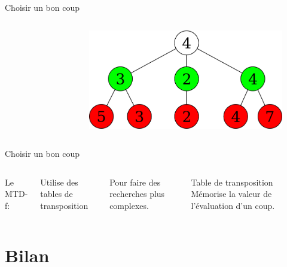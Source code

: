 \documentclass{beamer}
\begin{document}
\begin{frame}{Choisir un bon coup}
\begin{columns}
{{{\begin{figure}[h]
							\end{figure}
						} {
							\begin{figure}[h]
								\centering
								\includegraphics[width=\textwidth]{images/minimax_ex_3.png}
							\end{figure}
						}
					}
				}

		\end{columns}
	\end{frame}

	\begin{frame}{Choisir un bon coup}
		\begin{columns}
				Le MTD-f:

				\vspace{1em}
				 {
					Utilise des tables de transposition
				}

				\vspace{1em}
				\uncover<2-> {
					Pour faire des recherches plus complexes.
				}

			\column{0.5\textwidth}
				\uncover<1-> {
					\begin{alertblock}{Table de transposition}
						Mémorise la valeur de l'évaluation d'un coup.
					\end{alertblock}
				}
		\end{columns}
	\end{frame}

	\section{Bilan}
\end{document}
